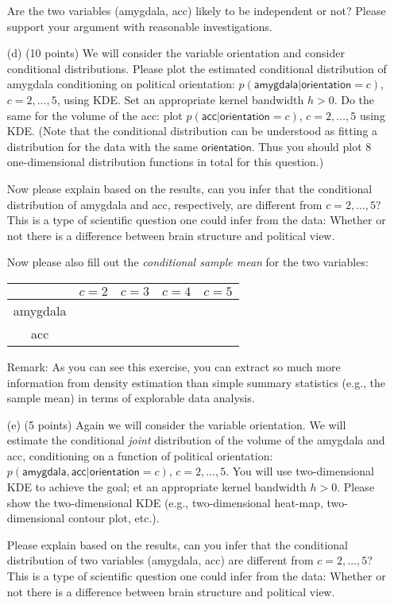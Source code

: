 \documentclass[12pt]{article}
\begin{document}
\begin{enumerate}
Are the two variables (\textsf{amygdala}, \textsf{acc}) likely to be independent or not? Please support your argument with reasonable investigations.


 \item[(d)] (10 points) We will consider the variable \textsf{orientation} and consider conditional distributions. Please plot the estimated conditional distribution of \textsf{amygdala} conditioning on political \textsf{orientation}: $p(\textsf{amygdala}|\textsf{orientation}=c)$, $c = 2, \ldots, 5$, using KDE. Set an appropriate kernel bandwidth $h >0$.  Do the same for the volume of the \textsf{acc}: plot $p(\textsf{acc}|\textsf{orientation}=c)$, $c = 2, \ldots, 5$ using KDE. (Note that the conditional distribution can be understood as fitting a distribution for the data with the same $\textsf{orientation}$. Thus you should plot 8 one-dimensional distribution functions in total for this question.) 
 
 
Now please explain based on the results, can you infer that the conditional distribution of  \textsf{amygdala} and \textsf{acc}, respectively, are different from $c = 2, \ldots, 5$? This is a type of scientific question one could infer from the data: Whether or not there is a difference between brain structure and political view. 

Now please also fill out the {\it conditional sample mean} for the two variables: %
\begin{center}
\begin{tabular}{|c|c|c|c|c|}
\hline
& $c = 2$ & $c = 3$ & $c = 4$ & $c = 5$ \\\hline
\textsf{amygdala} & & & & \\\hline
\textsf{acc} & & & & \\\hline
\end{tabular}
\end{center}
Remark: As you can see this exercise, you can extract so much more information from density estimation than simple summary statistics (e.g., the sample mean) in terms of explorable data analysis.  
 
 \item[(e)] (5 points) Again we will consider the variable \textsf{orientation}. We will estimate the conditional {\it joint} distribution of the volume of the \textsf{amygdala} and \textsf{acc}, conditioning on  a function of political \textsf{orientation}: $p(\textsf{amygdala}, \textsf{acc}|\textsf{orientation}=c)$, $c = 2, \ldots, 5$. You will use two-dimensional KDE to achieve the goal; et an appropriate kernel bandwidth $h >0$. Please show the two-dimensional KDE (e.g., two-dimensional heat-map, two-dimensional contour plot, etc.). 
 
 Please explain based on the results, can you infer that the conditional distribution of two variables (\textsf{amygdala}, \textsf{acc}) are different from $c = 2, \ldots, 5$? This is a type of scientific question one could infer from the data: Whether or not there is a difference between brain structure and political view.
 
  
 \end{enumerate}
\end{document}
